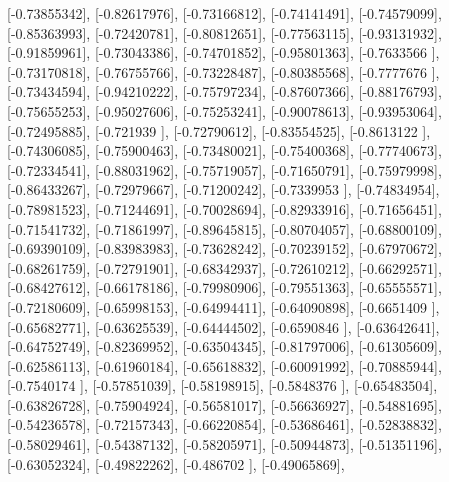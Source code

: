 \documentclass{article}
\begin{document}
       [-0.73855342],
       [-0.82617976],
       [-0.73166812],
       [-0.74141491],
       [-0.74579099],
       [-0.85363993],
       [-0.72420781],
       [-0.80812651],
       [-0.77563115],
       [-0.93131932],
       [-0.91859961],
       [-0.73043386],
       [-0.74701852],
       [-0.95801363],
       [-0.7633566 ],
       [-0.73170818],
       [-0.76755766],
       [-0.73228487],
       [-0.80385568],
       [-0.7777676 ],
       [-0.73434594],
       [-0.94210222],
       [-0.75797234],
       [-0.87607366],
       [-0.88176793],
       [-0.75655253],
       [-0.95027606],
       [-0.75253241],
       [-0.90078613],
       [-0.93953064],
       [-0.72495885],
       [-0.721939  ],
       [-0.72790612],
       [-0.83554525],
       [-0.8613122 ],
       [-0.74306085],
       [-0.75900463],
       [-0.73480021],
       [-0.75400368],
       [-0.77740673],
       [-0.72334541],
       [-0.88031962],
       [-0.75719057],
       [-0.71650791],
       [-0.75979998],
       [-0.86433267],
       [-0.72979667],
       [-0.71200242],
       [-0.7339953 ],
       [-0.74834954],
       [-0.78981523],
       [-0.71244691],
       [-0.70028694],
       [-0.82933916],
       [-0.71656451],
       [-0.71541732],
       [-0.71861997],
       [-0.89645815],
       [-0.80704057],
       [-0.68800109],
       [-0.69390109],
       [-0.83983983],
       [-0.73628242],
       [-0.70239152],
       [-0.67970672],
       [-0.68261759],
       [-0.72791901],
       [-0.68342937],
       [-0.72610212],
       [-0.66292571],
       [-0.68427612],
       [-0.66178186],
       [-0.79980906],
       [-0.79551363],
       [-0.65555571],
       [-0.72180609],
       [-0.65998153],
       [-0.64994411],
       [-0.64090898],
       [-0.6651409 ],
       [-0.65682771],
       [-0.63625539],
       [-0.64444502],
       [-0.6590846 ],
       [-0.63642641],
       [-0.64752749],
       [-0.82369952],
       [-0.63504345],
       [-0.81797006],
       [-0.61305609],
       [-0.62586113],
       [-0.61960184],
       [-0.65618832],
       [-0.60091992],
       [-0.70885944],
       [-0.7540174 ],
       [-0.57851039],
       [-0.58198915],
       [-0.5848376 ],
       [-0.65483504],
       [-0.63826728],
       [-0.75904924],
       [-0.56581017],
       [-0.56636927],
       [-0.54881695],
       [-0.54236578],
       [-0.72157343],
       [-0.66220854],
       [-0.53686461],
       [-0.52838832],
       [-0.58029461],
       [-0.54387132],
       [-0.58205971],
       [-0.50944873],
       [-0.51351196],
       [-0.63052324],
       [-0.49822262],
       [-0.486702  ],
       [-0.49065869],
\end{document}
